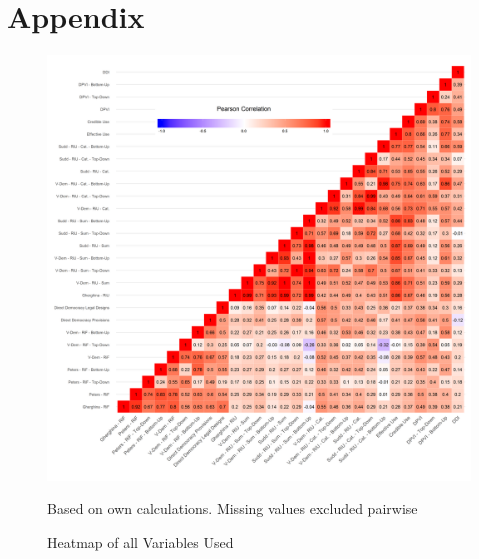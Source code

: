 \newpage
\section{Appendix}

\setcounter{table}{0}
\renewcommand{\thetable}{A\arabic{table}}

\setcounter{figure}{0}
\renewcommand{\thefigure}{A\arabic{figure}}

\small

\begin{figure}[!th]
	\caption{Heatmap of all Variables Used}
	\label{heatmap}
	\includegraphics[width=\textwidth]{images/heatmap_fin.png}
	\flushright
	{\scriptsize Based on own calculations. Missing values excluded pairwise \par}
\end{figure}

\clearpage

